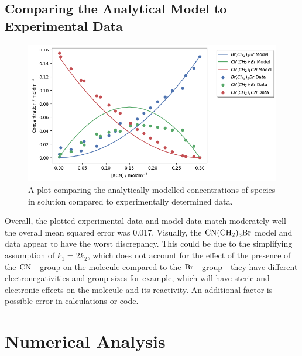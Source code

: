 \documentclass[twoside, 11pt]{article}
\begin{document}
\subsection{Comparing the Analytical Model to Experimental Data}
\begin{figure}[H]
    \centering
    \includegraphics[width=0.8\linewidth]{PartA_Plot.png}
    \caption{A plot comparing the analytically modelled concentrations of species in solution compared to experimentally determined data.}
    \label{fig:Plot_A}
\end{figure}
Overall, the plotted experimental data and model data match moderately well - the overall mean squared error was 0.017. Visually, the $\ce{CN(CH2)3Br}$ model and data appear to have the worst discrepancy. This could be due to the simplifying assumption of $k_1 = 2k_2$, which does not account for the effect of the presence of the $\ce{CN-}$ group on the molecule compared to the $\ce{Br-}$ group - they have different electronegativities and group sizes for example, which will have steric and electronic effects on the molecule and its reactivity. An additional factor is possible error in calculations or code.

\section{Numerical Analysis}
\label{sec:Numerical}
\end{document}
